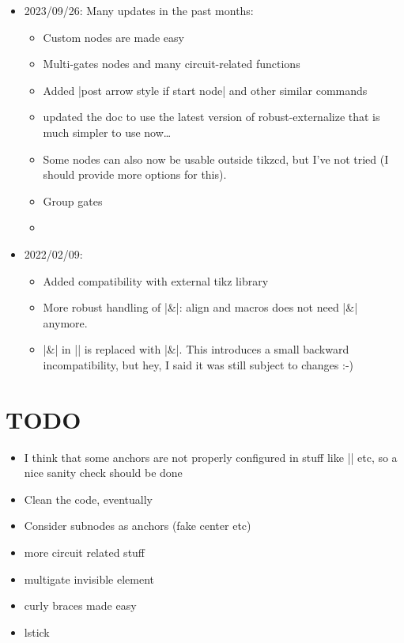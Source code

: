 \documentclass[a4paper,doc2]{ltxdoc} %
\begin{document}
\begin{itemize}
\item 2023/09/26:
  Many updates in the past months:
  \begin{itemize}
  \item Custom nodes are made easy
  \item Multi-gates nodes and many circuit-related functions
  \item Added |post arrow style if start node| and other similar commands
  \item updated the doc to use the latest version of robust-externalize that is much simpler to use now\dots
  \item Some nodes can also now be usable outside tikzcd, but I've not tried (I should provide more options for this).
  \item Group gates
  \item 
  \end{itemize}
\item 2022/02/09:
  \begin{itemize}
  \item Added compatibility with external tikz library
  \item More robust handling of |&|: align and macros does not need |\&| anymore.
  \item |\&| in |\zxSaveDiagram| is replaced with |&|. This introduces a small backward incompatibility, but hey, I said it was still subject to changes :-)
  \end{itemize}
\end{itemize}

\section{TODO}
\begin{itemize}
\item I think that some anchors are not properly configured in stuff like |\zxBox| etc, so a nice sanity check should be done
\item Clean the code, eventually
\item Consider subnodes as anchors (fake center etc)
\item more circuit related stuff
\item multigate invisible element
\item curly braces made easy
\item lstick
\end{itemize}

\printindex

\printbibliography[heading=bibintoc]
\end{document}
